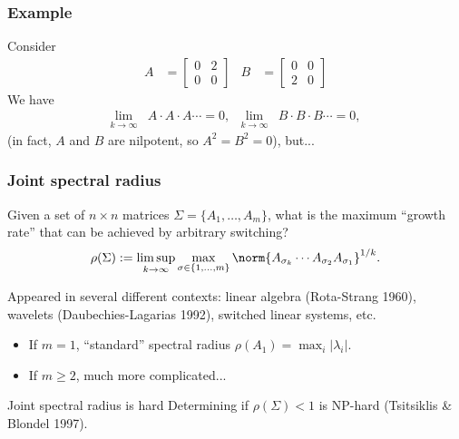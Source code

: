 \documentclass{beamer}
\begin{document}
  \begin{frame}
      \frametitle{Example}
      Consider
      \begin{align*}
          A & =
          \begin{bmatrix}
              0 & 2\\
              0 & 0
          \end{bmatrix}&
          B & =
          \begin{bmatrix}
              0 & 0\\
              2 & 0
          \end{bmatrix}
      \end{align*}
      We have
      \begin{align*}
          \lim_{k \to \infty}& A \cdot A \cdot A \cdots = 0,&
          \lim_{k \to \infty}& B \cdot B \cdot B \cdots = 0,
      \end{align*}
      (in fact, $A$ and $B$ are nilpotent, so $A^2 = B^2 = 0$), but...
  \end{frame}

  \begin{frame}
      \frametitle{Joint spectral radius}
      Given a set of $n \times n$ matrices $\Sigma = \{A_1,\ldots,A_m\}$,
      what is the maximum ``growth rate'' that can be achieved by \alert{arbitrary switching}?
      \[ \rho(\Sigma) := \limsup_{k\to\infty} \max_{\sigma \in \{1,\ldots,m\}} \norm{A_{\sigma_k} \cdots A_{\sigma_2}A_{\sigma_1}}^{1/k}. \]

      Appeared in several different contexts: linear algebra (Rota-Strang 1960), wavelets (Daubechies-Lagarias 1992),
      switched linear systems, etc.

      \begin{itemize}
          \item If $m = 1$, ``standard'' spectral radius $\rho(A_1) = \max_i |\lambda_i|$.
          \item If $m \geq 2$, much more complicated...
      \end{itemize}
  \end{frame}

  \begin{frame}{Joint spectral radius is hard}
  Determining if $\rho(\Sigma) < 1$ is \alert{NP-hard} (Tsitsiklis \& Blondel 1997).



  \end{frame}
\end{document}
